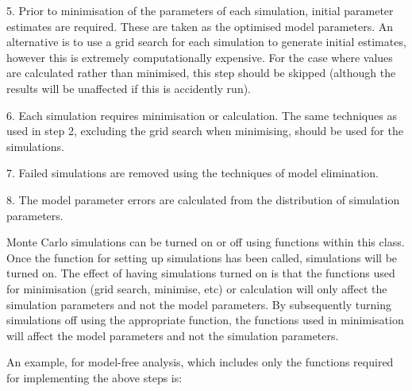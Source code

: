 5.  Prior to minimisation  of the parameters of each simulation, initial parameter estimates
are required.  These are taken as the optimised  model parameters.  An alternative is to use
a grid search for each simulation to generate initial estimates, however this is extremely
computationally expensive.  For the case where values are calculated rather than minimised, 
this step should be skipped (although the results will be unaffected if this is accidently
run).

6.  Each simulation requires minimisation  or calculation.  The same techniques as used in
step 2, excluding the grid search when minimising, should be used for the simulations.

7.  Failed simulations are removed using the techniques of model elimination.  

8.  The model parameter errors are calculated from the distribution of simulation
parameters.


Monte Carlo simulations can be turned on or off using functions within this class.  Once the
function for setting up simulations has been called, simulations will be turned on.  The
effect of having simulations turned on is that the functions used for minimisation  (grid
search, minimise,  etc) or calculation will only affect the simulation parameters and not the
model parameters.  By subsequently turning simulations off using the appropriate function,
the functions used in minimisation  will affect the model parameters and not the simulation
parameters.


An example, for model-free analysis, which includes only the functions required for
implementing the above steps is:







